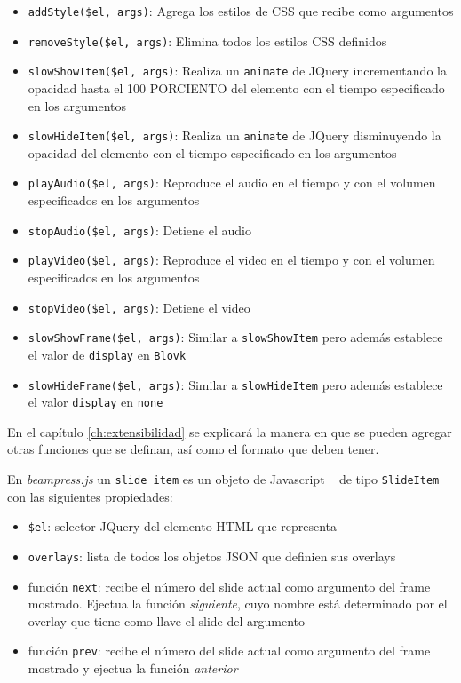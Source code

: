 			\begin{itemize}
				\item \texttt{addStyle(\$el, args)}: Agrega los estilos de CSS que recibe como argumentos
				\item \texttt{removeStyle(\$el, args)}: Elimina todos los estilos CSS definidos
				\item \texttt{slowShowItem(\$el, args)}: Realiza un \texttt{animate} de JQuery incrementando la opacidad hasta el 100 PORCIENTO del elemento con el tiempo especificado en los argumentos
				\item \texttt{slowHideItem(\$el, args)}: Realiza un \texttt{animate} de JQuery disminuyendo la opacidad del elemento con el tiempo especificado en los argumentos
				\item \texttt{playAudio(\$el, args)}: Reproduce el audio en el tiempo y con el volumen especificados en los argumentos
				\item \texttt{stopAudio(\$el, args)}: Detiene el audio
				\item \texttt{playVideo(\$el, args)}: Reproduce el video en el tiempo y con el volumen especificados en los argumentos
				\item \texttt{stopVideo(\$el, args)}: Detiene el video
				\item \texttt{slowShowFrame(\$el, args)}: Similar a \texttt{slowShowItem} pero además establece el valor de \texttt{display} en \texttt{Blovk}
				\item \texttt{slowHideFrame(\$el, args)}: Similar a \texttt{slowHideItem} pero además establece el valor \texttt{display} en \texttt{none}				
			\end{itemize}
			En el capítulo \ref{ch:extensibilidad} se explicará la manera en que se pueden agregar otras funciones que se definan, así como el formato que deben tener.

			En \textit{beampress.js} un \texttt{slide item} es un objeto de Javascript ~\cite{book:1047044} de tipo \texttt{SlideItem} con las siguientes propiedades:

			\begin{itemize}
			\label{it:slide_item}
			 	\item \texttt{\$el}: selector JQuery del elemento HTML que representa
			 	\item \texttt{overlays}: lista de todos los objetos JSON que definien sus overlays
			 	\item función \texttt{next}: recibe el número del slide actual como argumento del frame mostrado. Ejectua la función \textit{siguiente}, cuyo nombre está determinado por el overlay que tiene como llave el slide del argumento 
			 	\item función \texttt{prev}: recibe el número del slide actual como argumento del frame mostrado y ejectua la función \textit{anterior}			 	
			 \end{itemize} 
				
